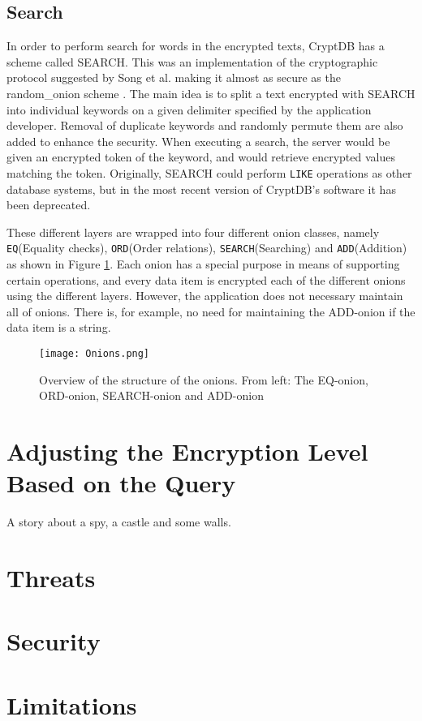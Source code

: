 \subsection{Search}
In order to perform search for words in the encrypted texts, CryptDB has a scheme called SEARCH. This was an implementation of the cryptographic protocol suggested by Song et al. making it almost as secure as the \gls{random_onion} scheme \citep{CryptDB_Main_Paper}. The main idea is to split a text encrypted with SEARCH into individual keywords on a given delimiter specified by the application developer. Removal of duplicate keywords and randomly permute them are also added to enhance the security. When executing a search, the server would be given an encrypted token of the keyword, and would retrieve encrypted values matching the token. Originally, SEARCH could perform \texttt{LIKE} operations as other database systems, but in the most recent version of CryptDB's software it has been deprecated. 


These different layers are wrapped into four different onion classes, namely \texttt{EQ}(Equality checks), \texttt{ORD}(Order relations), \texttt{SEARCH}(Searching) and \texttt{ADD}(Addition) as shown in Figure \ref{cryptdb_onions}. Each onion has a special purpose in means of supporting certain operations, and every data item is encrypted each of the different onions using the different layers. However, the application does not necessary maintain all of onions. There is, for example, no need for maintaining the ADD-onion if the data item is a string. 

\begin{figure}[ht]
	\texttt{[image: Onions.png]}
	\caption{Overview of the structure of the onions. From left: The EQ-onion, ORD-onion, SEARCH-onion and ADD-onion}
	\label{cryptdb_onions}
\end{figure}


\section{Adjusting the Encryption Level Based on the Query}
\label{adjust_enc_level}

A story about a spy, a castle and some walls.

\section{Threats}

\section{Security}

\section{Limitations}